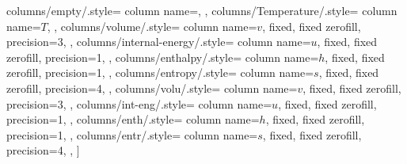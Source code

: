 \documentclass{article}
\begin{document}
\begin{center}
        columns/empty/.style={
            column name={},
        },
        columns/Temperature/.style={
            column name=$T$,
        },
        columns/volume/.style={
            column name=$v$,
            fixed,
            fixed zerofill,
            precision=3,
        },
        columns/internal-energy/.style={
            column name=$u$,
            fixed,
            fixed zerofill,
            precision=1,
        },
        columns/enthalpy/.style={
            column name=$h$,
            fixed,
            fixed zerofill,
            precision=1,
        },
        columns/entropy/.style={
            column name=$s$,
            fixed,
            fixed zerofill,
            precision=4,
        },
        columns/volu/.style={
            column name=$v$,
            fixed,
            fixed zerofill,
            precision=3,
        },
        columns/int-eng/.style={
            column name=$u$,
            fixed,
            fixed zerofill,
            precision=1,
        },
        columns/enth/.style={
            column name=$h$,
            fixed,
            fixed zerofill,
            precision=1,
        },
        columns/entr/.style={
            column name=$s$,
            fixed,
            fixed zerofill,
            precision=4,
        },
    ]{\pointzerosix}

    \vspace*{\baselineskip}


\end{center}
\end{document}
